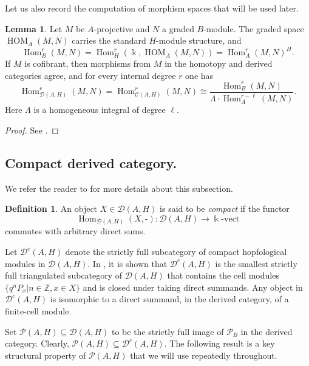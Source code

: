 \documentclass[11pt]{article}
\theoremstyle{definition}
\newtheorem{lem}[thm]{Lemma}
\newtheorem{defn}[thm]{Definition}
\numberwithin{equation}{section}
\newcommand{\kk}{\Bbbk}
\newcommand{\Pun}{\mathcal{P}_B}
\newcommand{\Tcat}{\mathcal{P}(A,H)}
\newcommand{\Dc}{\mathcal{D}^c(A,H)}
\newcommand{\Hom}{\operatorname{Hom}}
\newcommand{\HOM}{\operatorname{HOM}}
\newcommand{\Cat}{\mathcal{C}}
\newcommand{\Der}{\mathcal{D}}
\begin{document}
Let us also record the computation of morphism spaces that will be used later.

\begin{lem}\label{lem:Hom}
Let $M$ be $A$-projective and $N$ a graded $B$-module.  The graded space
$\HOM_A(M,N)$ carries the standard $H$-module structure, and
\[
\Hom_B^r(M,N)=\Hom_H^r(\kk,\HOM_A(M,N))= \Hom_A^r(M, N)^H .
\]
If $M$ is cofibrant, then morphisms from $M$ in the homotopy and derived
categories agree, and for every internal degree $r$ one has
\begin{equation}\label{eq:HOM-formula}
\Hom_{\Der(A,H)}^{r}(M,N)
=
\Hom_{\Cat(A,H)}^{r}(M,N)
\cong
\dfrac{\Hom_B^r(M,N)}
{\Lambda\cdot \Hom_A^{r-\ell}(M,N)} .
\end{equation}
Here $\Lambda$ is a homogeneous integral of degree $\ell$.  
\end{lem}
\begin{proof}
    See \cite[Proposition~5.10 and Corollary~6.10]{QYHopf}.
\end{proof}

\subsection{Compact derived category.} We refer the reader to \cite[Section 7]{QYHopf} for more details about this subsection.

\begin{defn}\label{def:compact-objects}An object $X\in \Der(A,H)$ is said to be
\emph{compact} if the functor $$\Hom_{\Der(A,H)}(X,\mbox{-}):\Der(A,H) \to \Bbbk\mbox{-}\mathrm{vect}$$ commutes
with arbitrary direct sums.
\end{defn}



Let $\Dc$ denote the strictly full subcategory of compact
hopfological modules in $\Der(A,H)$.  In \cite[Section 7.2]{QYHopf}, it is shown that $\Dc$ is the smallest strictly full triangulated subcategory of $\Der(A,H)$ that contains the cell modules $\{q^{n}P_x|n\in \mathbb{Z}, x\in X\}$ and
is closed under taking direct summands. Any object in $\Dc$ is isomorphic to a direct summand, in the derived category, 
of a finite-cell module. 


Set $\Tcat\subseteq\Der(A,H)$ to be the strictly full image of $\Pun$ in the derived category. Clearly, $\Tcat\subseteq\Dc$.
The following result is a key structural property of $\Tcat$ that we will use repeatedly throughout.  
\end{document}
